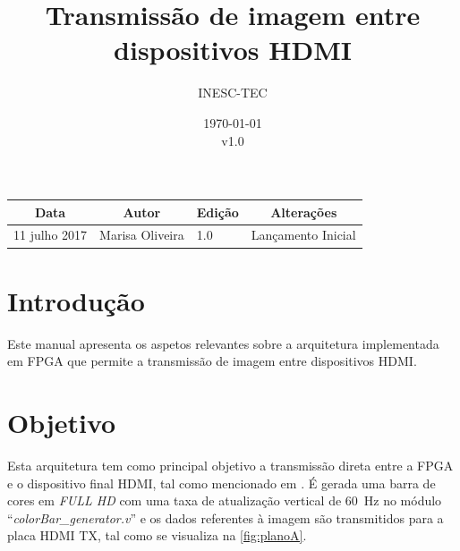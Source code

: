 \documentclass[11pt,a4paper]{article}
\title{Transmissão de imagem entre dispositivos HDMI} %
\author{INESC-TEC}
\date{\today \\ v1.0} %
\begin{document}
	
	\maketitle %
	
	\begin{table}[h!]
		\centering
		\label{my-label}
		\begin{tabular}{@{}llll@{}}
			\toprule
			\multicolumn{1}{c}{\textbf{Data}} & \multicolumn{1}{c}{\textbf{Autor}} & \multicolumn{1}{c}{\textbf{Edição}} & \multicolumn{1}{c}{\textbf{Alterações}} \\ \midrule
			11 julho 2017                     & Marisa Oliveira                    & 1.0                                 & Lançamento Inicial                       \\ \bottomrule
		\end{tabular}
	\end{table}
	
	
	
	\section{Introdução}
	
	Este manual apresenta os aspetos relevantes sobre a arquitetura implementada em FPGA que permite a transmissão de imagem entre dispositivos HDMI.
	
	\section{Objetivo}
	
	Esta arquitetura tem como principal objetivo a transmissão direta entre a FPGA e o dispositivo final HDMI, tal como mencionado em \cite{R041}. É gerada uma barra de cores em \textit{FULL HD} com uma taxa de atualização vertical de \SI{60}{\hertz} no módulo ``\textit{colorBar\_generator.v}'' e os dados referentes à imagem são transmitidos para a placa HDMI TX, tal como se visualiza na \cref{fig:planoA}.
\end{document}
